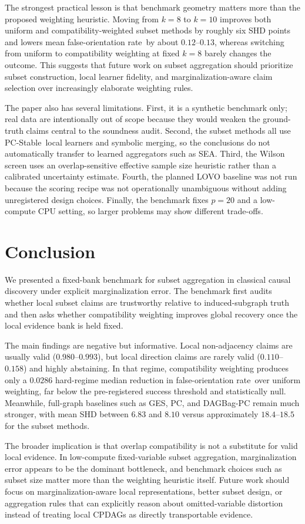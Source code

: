 \documentclass{article}
\newcommand{\pcstable}{PC-Stable}
\newcommand{\cpdag}{CPDAG}
\newcommand{\forate}{false-orientation rate}
\begin{document}
The strongest practical lesson is that benchmark geometry matters more than the proposed weighting heuristic. Moving from $k=8$ to $k=10$ improves both uniform and compatibility-weighted subset methods by roughly six SHD points and lowers mean \forate\ by about $0.12$--$0.13$, whereas switching from uniform to compatibility weighting at fixed $k=8$ barely changes the outcome. This suggests that future work on subset aggregation should prioritize subset construction, local learner fidelity, and marginalization-aware claim selection over increasingly elaborate weighting rules.

The paper also has several limitations. First, it is a synthetic benchmark only; real data are intentionally out of scope because they would weaken the ground-truth claims central to the soundness audit. Second, the subset methods all use \pcstable\ local learners and symbolic merging, so the conclusions do not automatically transfer to learned aggregators such as SEA. Third, the Wilson screen uses an overlap-sensitive effective sample size heuristic rather than a calibrated uncertainty estimate. Fourth, the planned LOVO baseline was not run because the scoring recipe was not operationally unambiguous without adding unregistered design choices. Finally, the benchmark fixes $p=20$ and a low-compute CPU setting, so larger problems may show different trade-offs.

\section{Conclusion}
\label{sec:conclusion}

We presented a fixed-bank benchmark for subset aggregation in classical causal discovery under explicit marginalization error. The benchmark first audits whether local subset claims are trustworthy relative to induced-subgraph truth and then asks whether compatibility weighting improves global recovery once the local evidence bank is held fixed.

The main findings are negative but informative. Local non-adjacency claims are usually valid ($0.980$--$0.993$), but local direction claims are rarely valid ($0.110$--$0.158$) and highly abstaining. In that regime, compatibility weighting produces only a $0.0286$ hard-regime median reduction in \forate\ over uniform weighting, far below the pre-registered success threshold and statistically null. Meanwhile, full-graph baselines such as GES, PC, and DAGBag-PC remain much stronger, with mean SHD between $6.83$ and $8.10$ versus approximately $18.4$--$18.5$ for the subset methods.

The broader implication is that overlap compatibility is not a substitute for valid local evidence. In low-compute fixed-variable subset aggregation, marginalization error appears to be the dominant bottleneck, and benchmark choices such as subset size matter more than the weighting heuristic itself. Future work should focus on marginalization-aware local representations, better subset design, or aggregation rules that can explicitly reason about omitted-variable distortion instead of treating local \cpdag s as directly transportable evidence.



\end{document}
